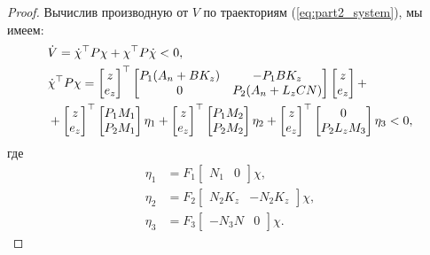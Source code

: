 \begin{proof}
Вычислив производную от $V$ по траекториям (\ref{eq:part2_system}), мы имеем:
\begin{align}
	& \dot{V} = \dot{\chi}^\top {P} \chi + \chi^\top {P} \dot{\chi} < 0,\\
	& \nonumber \dot{\chi}^\top {P} \chi = 
	\begin{bmatrix}
		{z} \\
		e_z
	\end{bmatrix}^\top
	\begin{bmatrix}
		{P}_1({A}_n + {B}{K}_z)
		&
		-{P}_1 {B}{K}_z
		\\
		0
		&
		{P}_2({A}_n + {L}_z {C}N)
	\end{bmatrix}
	\begin{bmatrix}
		{z} \\
		e_z
	\end{bmatrix}
	+
	\\
	& + \begin{bmatrix}
		{z} \\
		e_z
	\end{bmatrix}^\top
	\begin{bmatrix}
	{P}_1 {M}_1 \\ {P}_2 {M}_1
	\end{bmatrix}
	\eta _1
	+
	\begin{bmatrix}
		{z} \\
		e_z
	\end{bmatrix}^\top
	\begin{bmatrix}
		{P}_1 {M}_2 \\ {P}_2 {M}_2
	\end{bmatrix}
	\eta_2
	+
	\begin{bmatrix}
		{z} \\
		e_z
	\end{bmatrix}^\top
	\begin{bmatrix}
		0 \\ {P}_2 {L}_z M_3
	\end{bmatrix}
	\eta_3
	< 0,
\end{align}
где
%
\begin{align}
	\eta_1&={F}_1\begin{bmatrix}
		{N}_1 &0
	\end{bmatrix}\chi ,\\
	\eta_2&={F}_2\begin{bmatrix}
		{N}_2{K}_z & -{N}_2{K}_z
	\end{bmatrix}\chi, \\
	\label{eq:eta_3_thm3}
	\eta_3&={F}_3\begin{bmatrix}
		-{N}_3{N} & 0
	\end{bmatrix}\chi.

\end{align}
\end{proof}
